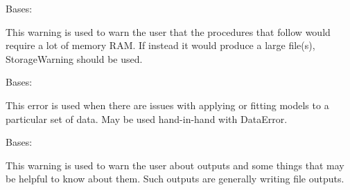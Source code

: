 \documentclass[letterpaper,10pt,english]{sphinxmanual}
\begin{document}

\begin{fulllineitems}
\label{\detokenize{python_docstrings/IfA_Smeargle.meta.errors:IfA_Smeargle.meta.errors.MemoryWarning}}
Bases: {\hyperref[\detokenize{python_docstrings/IfA_Smeargle.meta.errors:IfA_Smeargle.meta.errors.Smeargle_Warning}]{}}

This warning is used to warn the user that the procedures that follow
would require a lot of memory RAM. If instead it would produce a large
file(s), StorageWarning should be used.

\end{fulllineitems}


\begin{fulllineitems}
\label{\detokenize{python_docstrings/IfA_Smeargle.meta.errors:IfA_Smeargle.meta.errors.ModelingError}}
Bases: {\hyperref[\detokenize{python_docstrings/IfA_Smeargle.meta.errors:IfA_Smeargle.meta.errors.Smeargle_Exception}]{}}

This error is used when there are issues with applying or fitting models
to a particular set of data. May be used hand-in-hand with DataError.

\end{fulllineitems}


\begin{fulllineitems}
\label{\detokenize{python_docstrings/IfA_Smeargle.meta.errors:IfA_Smeargle.meta.errors.OutputWarning}}
Bases: {\hyperref[\detokenize{python_docstrings/IfA_Smeargle.meta.errors:IfA_Smeargle.meta.errors.Smeargle_Warning}]{}}

This warning is used to warn the user about outputs and some things that
may be helpful to know about them. Such outputs are generally writing
file outputs.

\end{fulllineitems}
\end{document}
